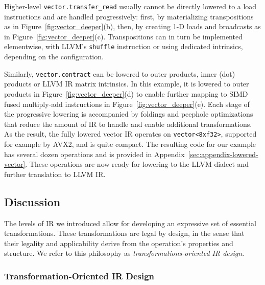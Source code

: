 Higher-level \lstinline|vector.transfer_read| usually cannot be directly lowered to a load instructions and are handled progressively:
first, by materializing transpositions as in Figure~\ref{fig:vector_deeper}(b), then, by creating 1-D loads and broadcasts as in Figure~\ref{fig:vector_deeper}(c).
Transpositions can in turn be implemented elementwise, with LLVM's \lstinline{shuffle} instruction or using dedicated intrinsics, depending on the configuration.

Similarly, \lstinline|vector.contract| can be lowered to outer products, inner (dot) products or LLVM IR matrix intrinsics.
In this example, it is lowered to outer products in Figure~\ref{fig:vector_deeper}(d)
to enable further mapping to SIMD fused multiply-add instructions in Figure~\ref{fig:vector_deeper}(e).
Each stage of the progressive lowering is accompanied by foldings and peephole optimizations that reduce the amount of IR to handle and enable additional transformations.
As the result, the fully lowered vector IR operates on \lstinline{vector<8xf32>}, supported for example by AVX2, and is quite compact. The resulting code for our example has several dozen operations and is provided in Appendix~\ref{sec:appendix-lowered-vector}. These operations are now ready for lowering to the LLVM dialect and further translation to LLVM IR.

\subsection{Discussion}
\label{subsec:discussion}

The levels of IR we introduced allow for developing an expressive set of essential transformations. These transformations are legal by design, in the sense that their legality and applicability derive from the operation's properties and structure.
We refer to this philosophy as \emph{transformations-oriented IR design}. 

\subsubsection{Transformation-Oriented IR Design}
\label{subsubsec:transformation-oriented-ir-design}

